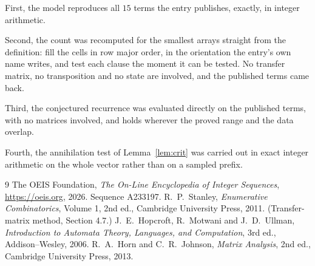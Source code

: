 \documentclass[11pt,a4paper]{article}
\theoremstyle{plain}
\theoremstyle{definition}
\begin{document}
First, the model reproduces all $15$ terms the entry publishes, exactly, in integer
arithmetic.

Second, the count was recomputed for the smallest arrays straight from the definition: fill the
cells in row major order, in the orientation the entry's own name writes, and test each clause
the moment it can be tested. No transfer matrix, no transposition and no state are involved,
and the published terms came back.

Third, the conjectured recurrence was evaluated directly on the published terms, with no
matrices involved, and holds wherever the proved range and the data overlap.

Fourth, the annihilation test of Lemma~\ref{lem:crit} was carried out in exact integer
arithmetic on the whole vector rather than on a sampled prefix.

\begin{thebibliography}{9}
 The OEIS Foundation, \emph{The On-Line Encyclopedia of Integer
Sequences}, \url{https://oeis.org}, 2026. Sequence A233197.
 R.~P.~Stanley, \emph{Enumerative Combinatorics}, Volume 1, 2nd ed.,
Cambridge University Press, 2011. (Transfer-matrix method, Section 4.7.)
 J.~E.~Hopcroft, R.~Motwani and J.~D.~Ullman, \emph{Introduction to Automata
Theory, Languages, and Computation}, 3rd ed., Addison--Wesley, 2006.
 R.~A.~Horn and C.~R.~Johnson, \emph{Matrix Analysis}, 2nd ed., Cambridge
University Press, 2013.
\end{thebibliography}
\end{document}
